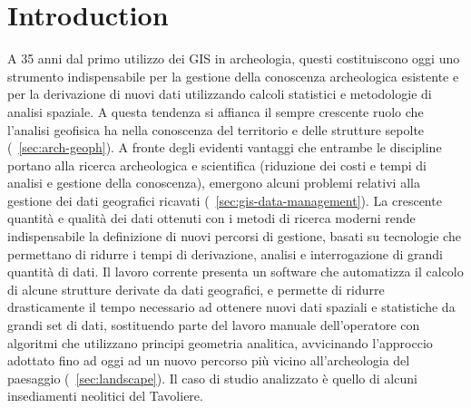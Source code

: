 \chapter{Introduction}

    \begin{chaptersum}
        A 35 anni dal primo utilizzo dei GIS in archeologia, questi costituiscono oggi uno strumento indispensabile per la gestione della conoscenza archeologica esistente e per la derivazione di nuovi dati utilizzando calcoli statistici e metodologie di analisi spaziale. A questa tendenza si affianca il sempre crescente ruolo che l'analisi geofisica ha nella conoscenza del territorio e delle strutture sepolte (\textsection~\ref{sec:arch-geoph}). A fronte degli evidenti vantaggi che entrambe le discipline portano alla ricerca archeologica e scientifica (riduzione dei costi e tempi di analisi e gestione della conoscenza), emergono alcuni problemi relativi alla gestione dei dati geografici ricavati (\textsection~\ref{sec:gis-data-management}). La crescente quantità e qualità dei dati ottenuti con i metodi di ricerca moderni rende indispensabile la definizione di nuovi percorsi di gestione, basati su tecnologie che permettano di ridurre i tempi di derivazione, analisi e interrogazione di grandi quantità di dati. Il lavoro corrente presenta un software che automatizza il calcolo di alcune strutture derivate da dati geografici, e permette di ridurre drasticamente il tempo necessario ad ottenere nuovi dati spaziali e statistiche da grandi set di dati, sostituendo parte del lavoro manuale dell'operatore con algoritmi che utilizzano principi geometria analitica, avvicinando l'approccio adottato fino ad oggi ad un nuovo percorso più vicino all'archeologia del paesaggio (\textsection~\ref{sec:landscape}). Il caso di studio analizzato è quello di alcuni insediamenti neolitici del Tavoliere.
    \end{chaptersum}

